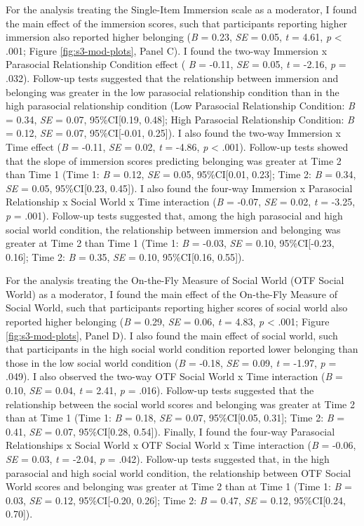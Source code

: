 \documentclass[
]{udthesis}
\begin{document}
For the analysis treating the Single-Item Immersion scale as a
moderator, I found the main effect of the immersion scores, such that
participants reporting higher immersion also reported higher belonging
(\emph{B} = 0.23, \emph{SE} = 0.05, \emph{t} = 4.61, \emph{p} \textless{} .001; Figure
\ref{fig:s3-mod-plots}, Panel C). I found the two-way Immersion x
Parasocial Relationship Condition effect (
\emph{B} = -0.11, \emph{SE} = 0.05, \emph{t} = -2.16, \emph{p} = .032).
Follow-up tests suggested that the relationship between immersion and belonging was
greater in the low parasocial relationship condition than in the high parasocial relationship condition
(Low Parasocial Relationship Condition: \emph{B} = 0.34, \emph{SE} = 0.07, 95\%CI{[}0.19, 0.48{]}; High Parasocial Relationship Condition: \emph{B} = 0.12, \emph{SE} = 0.07, 95\%CI{[}-0.01, 0.25{]}).
I also found the two-way Immersion x Time
effect
(\emph{B} = -0.11, \emph{SE} = 0.02, \emph{t} = -4.86, \emph{p} \textless{} .001).
Follow-up tests showed that the slope of immersion scores predicting
belonging was greater at Time 2 than Time 1 (Time 1:
\emph{B} = 0.12, \emph{SE} = 0.05, 95\%CI{[}0.01, 0.23{]}; Time 2: \emph{B} = 0.34, \emph{SE} = 0.05, 95\%CI{[}0.23, 0.45{]}). I also found
the four-way Immersion x Parasocial Relationship x Social World x Time
interaction
(\emph{B} = -0.07, \emph{SE} = 0.02, \emph{t} = -3.25, \emph{p} = .001).
Follow-up tests suggested that, among the high parasocial and high
social world condition, the relationship between immersion and belonging
was greater at Time 2 than Time 1 (Time 1:
\emph{B} = -0.03, \emph{SE} = 0.10, 95\%CI{[}-0.23, 0.16{]};
Time 2:
\emph{B} = 0.35, \emph{SE} = 0.10, 95\%CI{[}0.16, 0.55{]}).

For the analysis treating the On-the-Fly Measure of Social World (OTF
Social World) as a moderator, I found the main effect of the On-the-Fly
Measure of Social World, such that participants reporting higher scores
of social world also reported higher belonging
(\emph{B} = 0.29, \emph{SE} = 0.06, \emph{t} = 4.83, \emph{p} \textless{} .001; Figure
\ref{fig:s3-mod-plots}, Panel D). I also
found the main effect of social world, such that participants in the
high social world condition reported lower belonging than those in the
low social world condition
(\emph{B} = -0.18, \emph{SE} = 0.09, \emph{t} = -1.97, \emph{p} = .049). I also
observed the two-way OTF Social World x Time interaction
(\emph{B} = 0.10, \emph{SE} = 0.04, \emph{t} = 2.41, \emph{p} = .016). Follow-up tests
suggested that the relationship between the social world scores and
belonging was greater at Time 2 than at Time 1 (Time 1:
\emph{B} = 0.18, \emph{SE} = 0.07, 95\%CI{[}0.05, 0.31{]}; Time 2: \emph{B} = 0.41, \emph{SE} = 0.07, 95\%CI{[}0.28, 0.54{]}).
Finally, I found the four-way Parasocial Relationships x Social World x
OTF Social World x Time interaction
(\emph{B} = -0.06, \emph{SE} = 0.03, \emph{t} = -2.04, \emph{p} = .042).
Follow-up tests suggested that, in the high parasocial and high social
world condition, the relationship between OTF Social World scores and
belonging was greater at Time 2 than at Time 1 (Time 1:
\emph{B} = 0.03, \emph{SE} = 0.12, 95\%CI{[}-0.20, 0.26{]};
Time 2:
\emph{B} = 0.47, \emph{SE} = 0.12, 95\%CI{[}0.24, 0.70{]}).
\end{document}
